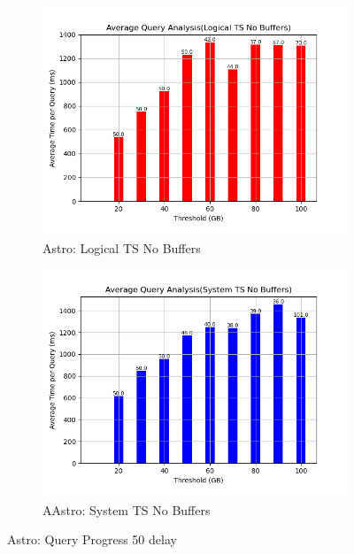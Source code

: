 \begin{figure}
\begin{subfigure}[c]{0.45\textwidth}
	\end{subfigure}
	\begin{subfigure}[c]{0.45\textwidth}
		\includegraphics[width=1\textwidth]	 {figures/Experiments/Dynamic/ASTRO/Batch_processing/50/average_query_time_per_batch_version_999777016_10485760_10_delay[50].png}
		\caption{Astro: Logical TS No Buffers}
		\label{fig:logical-ts-no-50-astro}
	\end{subfigure}
	\begin{subfigure}[c]{0.45\textwidth}
		\includegraphics[width=1\textwidth]	 {figures/Experiments/Dynamic/ASTRO/Batch_processing/50/average_query_time_per_batch_version_999777017_10485760_10_delay[50].png}
		\caption{AAstro: System TS No Buffers}
		\label{fig:system-ts-no-50-astro}
	\end{subfigure}
	\caption{Astro: Query Progress 50 delay}
	\label{fig:query-progress-50-astro}
\end{figure}
